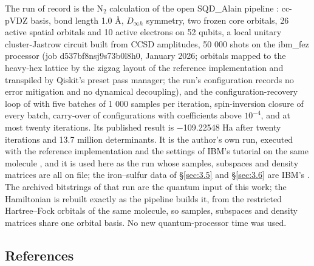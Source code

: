 \documentclass[11pt]{article}
\begin{document}
The run of record is the N$_2$ calculation of the open SQD\_Alain pipeline \cite{SQDAlain}: cc-pVDZ basis, bond length 1.0 \AA{}, $D_{\infty h}$ symmetry, two frozen core orbitals, 26 active spatial orbitals and 10 active electrons on 52 qubits, a local unitary cluster-Jastrow circuit built from CCSD amplitudes, 50 000 shots on the ibm\_fez processor (job d537bf8nsj9s73b0l8h0, January 2026; orbitals mapped to the heavy-hex lattice by the zigzag layout of the reference implementation and transpiled by Qiskit's preset pass manager; the run's configuration records no error mitigation and no dynamical decoupling), and the configuration-recovery loop of \cite{SQD} with five batches of 1 000 samples per iteration, spin-inversion closure of every batch, carry-over of configurations with coefficients above $10^{-4}$, and at most twenty iterations. Its published result is $-$109.22548 Ha after twenty iterations and 13.7 million determinants. It is the author's own run, executed with the reference implementation and the settings of IBM's tutorial on the same molecule \cite{IBMtutorial}, and it is used here as the run whose samples, subspaces and density matrices are all on file; the iron--sulfur data of \S\ref{sec:3.5} and \S\ref{sec:3.6} are IBM's \cite{IBMdata}. The archived bitstrings of that run are the quantum input of this work; the Hamiltonian is rebuilt exactly as the pipeline builds it, from the restricted Hartree--Fock orbitals of the same molecule, so samples, subspaces and density matrices share one orbital basis. No new quantum-processor time was used.

\subsection{References}\label{sec:2.2}
\end{document}
